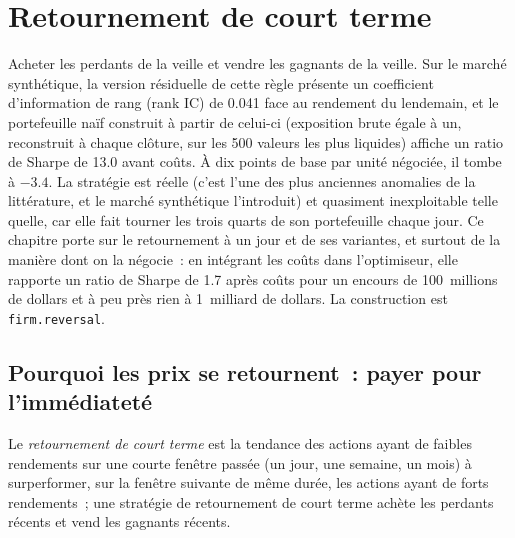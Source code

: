\chapter{Retournement de court terme}\label{ch:s1:short-term-reversal}

Acheter les perdants de la veille et vendre les gagnants de la veille. Sur le marché synthétique, la version résiduelle de cette règle présente un coefficient d'information de rang (rank IC) de 0.041
face au rendement du lendemain, et le portefeuille naïf construit à partir de celui-ci (exposition brute égale à un, reconstruit à chaque clôture, sur les 500 valeurs les plus liquides) affiche un ratio de Sharpe de
13.0 avant coûts. À dix points de base par unité négociée, il tombe à $-3.4$. La stratégie est réelle (c'est l'une des plus anciennes anomalies de la littérature, et le
marché synthétique l'introduit) et quasiment inexploitable telle quelle, car elle fait tourner les trois quarts de son portefeuille chaque jour. Ce chapitre porte sur le retournement à un jour
et de ses variantes, et surtout de la manière dont on la négocie~: en intégrant les coûts dans l'optimiseur, elle rapporte un ratio de Sharpe de 1.7 après coûts pour un encours de 100~millions de dollars
et à peu près rien à 1~milliard de dollars. La construction est \texttt{firm.reversal}.

\section{Pourquoi les prix se retournent~: payer pour l'immédiateté}

\begin{definition}\label{def:s1:short-term-reversal:reversal}
Le \emph{retournement de court terme} est la tendance des actions ayant de faibles rendements sur une courte fenêtre passée (un jour, une semaine, un mois) à
surperformer, sur la fenêtre suivante de même durée, les actions ayant de forts rendements~; une stratégie de retournement de court terme achète les perdants récents et vend les gagnants récents.
\end{definition}

